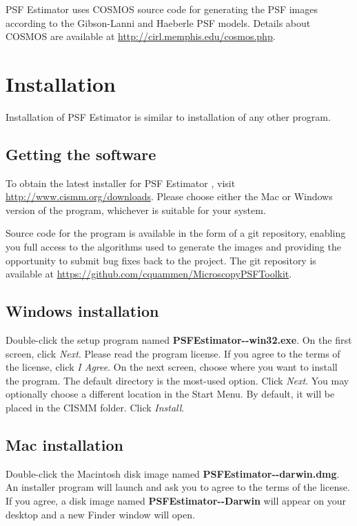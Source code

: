 \documentclass[11pt,titlepage,twoside]{article}
\begin{document}
PSF Estimator uses COSMOS source code for generating the PSF images according to the Gibson-Lanni and Haeberle PSF models. Details about COSMOS are available at \url{http://cirl.memphis.edu/cosmos.php}.

\section{Installation}

Installation of PSF Estimator \ProgramVersion is similar to installation of any other program.

\subsection{Getting the software}

To obtain the latest installer for PSF Estimator \ProgramVersionNoSpace, visit \url{http://www.cismm.org/downloads}. Please choose either the Mac or Windows version of the program, whichever is suitable for your system.

Source code for the program is available in the form of a git repository, enabling you full access to the algorithms used to generate the images and providing the opportunity to submit bug fixes back to the project. The git repository is available at \url{https://github.com/cquammen/MicroscopyPSFToolkit}.

\subsection{Windows installation}

Double-click the setup program named \textbf{PSFEstimator-\ProgramVersionNoSpace-win32.exe}. On the first screen, click \emph{Next}. Please read the program license. If you agree to the terms of the license, click \emph{I Agree}. On the next screen, choose where you want to install the program. The default directory is the most-used option. Click \emph{Next}. You may optionally choose a different location in the Start Menu. By default, it will be placed in the CISMM folder. Click \emph{Install}.

\subsection{Mac installation}

Double-click the Macintosh disk image named \textbf{PSFEstimator-\ProgramVersionNoSpace-darwin.dmg}. An installer program will launch and ask you to agree to the terms of the license. If you agree, a disk image named \textbf{PSFEstimator-\ProgramVersionNoSpace-Darwin} will appear on your desktop and a new Finder window will open.
\end{document}
